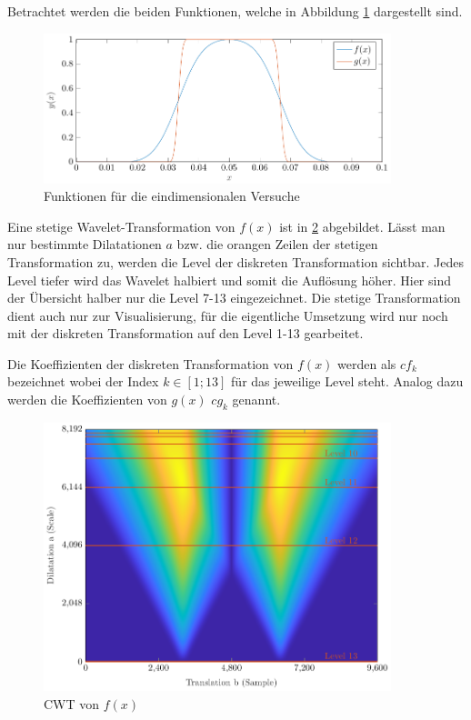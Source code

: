 Betrachtet werden die beiden Funktionen, welche in Abbildung \ref{deconvolve:1d} dargestellt sind.
\begin{figure}[h]
\centering
\includegraphics[width=0.9\textwidth]{./papers/deconvolve/pictures/1d.pdf}
\caption{Funktionen für die eindimensionalen Versuche\label{deconvolve:1d}}
\end{figure}
Eine stetige Wavelet-Transformation von $f(x)$ ist in \ref{deconvolve:y1_cwt} abgebildet.
Lässt man nur bestimmte Dilatationen $a$ bzw. die orangen \glqq Zeilen\grqq{} der stetigen Transformation zu, werden die Level der diskreten Transformation sichtbar.
Jedes Level tiefer wird das Wavelet \glqq halbiert \grqq{} und somit die Auflösung höher.
Hier sind der Übersicht halber nur die Level 7-13 eingezeichnet. 
Die stetige Transformation dient auch nur zur Visualisierung, für die eigentliche Umsetzung wird nur noch mit der diskreten Transformation auf den Level 1-13 gearbeitet.

Die Koeffizienten der diskreten Transformation von $f(x)$ werden als $cf_k$ bezeichnet wobei der Index $k\in[1;13]$ für das jeweilige Level steht.
Analog dazu werden die Koeffizienten von $g(x)$ $cg_k$ genannt.
\begin{figure}[h]
\centering
\includegraphics[width=0.9\textwidth]{./papers/deconvolve/pictures/y1_cwt.pdf}
\caption{CWT von $f(x)$\label{deconvolve:y1_cwt}}
\end{figure}

